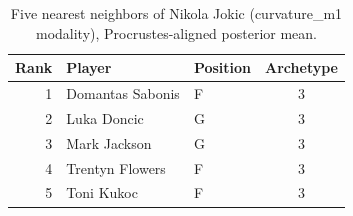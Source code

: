 \begin{table}[htbp]
  \centering\small
  \begin{tabular}{rllc}
    \toprule
    Rank & Player & Position & Archetype \\
    \midrule
    1 & Domantas Sabonis & F & 3 \\
    2 & Luka Doncic & G & 3 \\
    3 & Mark Jackson & G & 3 \\
    4 & Trentyn Flowers & F & 3 \\
    5 & Toni Kukoc & F & 3 \\
    \bottomrule
  \end{tabular}
  \caption{Five nearest neighbors of Nikola Jokic (curvature_m1 modality), Procrustes-aligned posterior mean.}
  \label{tab:Nikola_Jokic_neighbors_curvature_m1}
\end{table}

